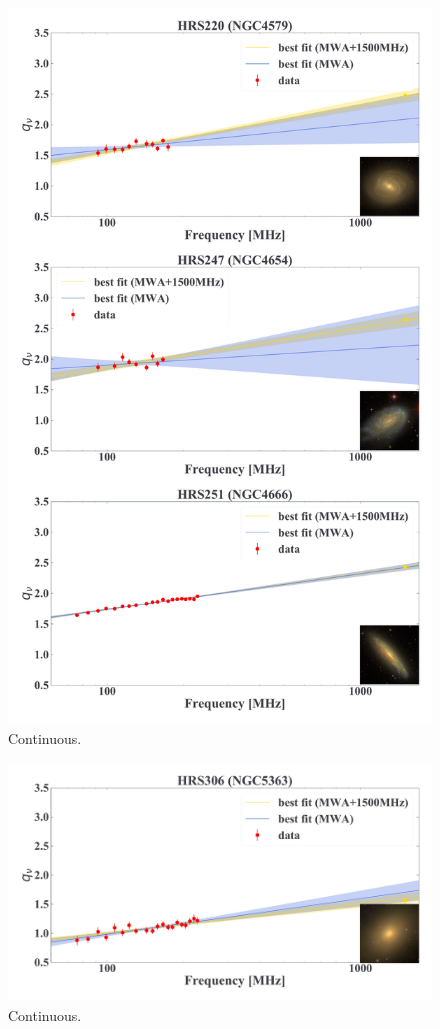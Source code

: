 \documentclass[12pt,a4paper,twoside,openright,final,titlepage]{report}
\begin{document}
\begin{figure}[htbp]
    \centering
    \includegraphics[width=.85\linewidth]{Figures/AppendixC_qfitting6.pdf}
    \caption[Fitting results for 18 samples (6)]{\label{fig:fittingresults6}
        Continuous.
    }
\end{figure}

\begin{figure}[htbp]
    \centering
    \includegraphics[width=.85\linewidth]{Figures/AppendixC_qfitting7.pdf}
    \caption[Fitting results for 18 samples (7)]{\label{fig:fittingresults7}
        Continuous.
    }
\end{figure}
\end{document}
